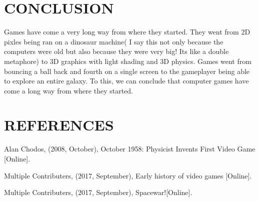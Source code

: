 \documentclass[letterpaper, 10 pt, conference]{IEEEconf}
\begin{document}
\section{CONCLUSION}
	Games have come a very long way from where they started. They went from 2D pixles being ran on a dinosaur machine( I say this not only because the computers were old but also because they were very big! Its like a double metaphore) to 3D graphics with light shading and 3D physics. Games went from bouncing a ball back and fourth on a single screen to the gameplayer being able to explore an entire galaxy. To this, we can conclude that computer games have come a long way from where they started. 

\section*{REFERENCES}

\begin{enumerate}[label={[\arabic*]}]
\item Alan Chodos, (2008, October),
October 1958: Physicist Invents First Video Game [Online].
\item Multiple Contributers, (2017, September),
Early history of video games [Online].
\item Multiple Contributers, (2017, September),
Spacewar![Online]. 

\end{enumerate}
\end{document}
